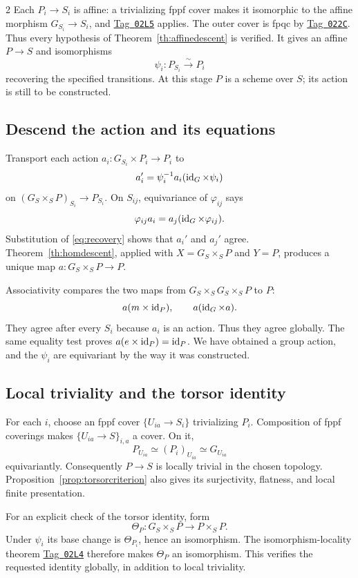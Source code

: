 \documentclass[12pt]{memoir}
\newcommand{\BGtag}[1]{\href{https://stacks.math.columbia.edu/tag/#1}{Tag~\texttt{#1}}}
\begin{document}
\begin{multicols}{2}
Each $P_i\to S_i$ is affine: a trivializing fppf cover makes it
isomorphic to the affine morphism $G_{S_i}\to S_i$, and
\BGtag{02L5} applies. The outer cover is fpqc by \BGtag{022C}.
Thus every hypothesis of Theorem~\ref{th:affinedescent} is verified.
It gives an affine $P\to S$ and isomorphisms
\[
 \psi_i:P_{S_i}\xrightarrow{\sim}P_i
\]
recovering the specified transitions. At this stage $P$ is a scheme over
$S$; its action is still to be constructed.

\subsection{Descend the action and its equations}
Transport each action $a_i:G_{S_i}\times P_i\to P_i$ to
\[
 a_i'=\psi_i^{-1}a_i(\operatorname{id}_G\times\psi_i)
\]
on $(G_S\times_S P)_{S_i}\to P_{S_i}$. On $S_{ij}$, equivariance of
$\varphi_{ij}$ says
\[
 \varphi_{ij}a_i=a_j(\operatorname{id}_G\times\varphi_{ij}).
\]
Substitution of \eqref{eq:recovery} shows that $a_i'$ and $a_j'$ agree.
Theorem~\ref{th:homdescent}, applied with $X=G_S\times_S P$ and $Y=P$,
produces a unique map $a:G_S\times_S P\to P$.

Associativity compares the two maps from $G_S\times_S G_S\times_S P$
to $P$:
\[
 a(m\times\operatorname{id}_P),\qquad a(\operatorname{id}_G\times a).
\]
They agree after every $S_i$ because $a_i$ is an action. Thus they agree
globally. The same equality test proves
$a(e\times\operatorname{id}_P)=\operatorname{id}_P$. We have obtained a group action, and the
$\psi_i$ are equivariant by the way it was constructed.

\subsection{Local triviality and the torsor identity}
For each $i$, choose an fppf cover $\{U_{ia}\to S_i\}$ trivializing
$P_i$. Composition of fppf coverings makes
$\{U_{ia}\to S\}_{i,a}$ a cover. On it,
\[
 P_{U_{ia}}\simeq(P_i)_{U_{ia}}\simeq G_{U_{ia}}
\]
equivariantly. Consequently $P\to S$ is locally trivial in the chosen
topology. Proposition~\ref{prop:torsorcriterion} also gives its
surjectivity, flatness, and local finite presentation.

For an explicit check of the torsor identity, form
\[
 \Theta_P:G_S\times_S P\to P\times_S P.
\]
Under $\psi_i$ its base change is $\Theta_{P_i}$, hence an isomorphism.
The isomorphism-locality theorem \BGtag{02L4} therefore makes
$\Theta_P$ an isomorphism. This verifies the requested identity globally,
in addition to local triviality.


\end{multicols}
\end{document}
